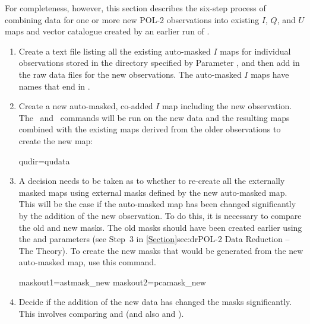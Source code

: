 For completeness, however, this section describes the six-step process of
combining data for one or more new POL-2 observations into existing $I$, $Q$,
and $U$ maps and vector catalogue created by an earlier run of .
\begin{enumerate}

\item Create a text file listing all the existing auto-masked $I$ maps
  for individual observations stored in the directory specified by
  Parameter , and then add in the raw data files for the new
  observations. The auto-masked $I$ maps have names that end in
  .

\begin{terminalv}
\end{terminalv}


\item Create a new auto-masked, co-added $I$ map including the new
  observation. The \calcqu\ and \makemap\ commands   will be run on the new
  data and the resulting maps combined with the existing maps derived
  from the older observations to create the new map:

\begin{terminalv}
     qudir=qudata
\end{terminalv}


\item A decision needs to be taken as to whether to re-create all the
  externally masked maps using external masks defined by the new
  auto-masked map. This will be the case if the auto-masked map has
  been changed significantly by the addition of the new
  observation. To do this, it is necessary to compare the old and new
  masks. The old masks should have been created earlier using the
   and  parameters (see Step~3 in
  \cref{Section}{sec:dr}{POL-2 Data Reduction -- The Theory}). To
  create the new masks that would be generated from the new
  auto-masked map, use this command.

\begin{terminalv}
     maskout1=astmask_new  maskout2=pcamask_new
\end{terminalv}

\item Decide if the addition of the new data has changed the masks
  significantly. This involves comparing  and
   (and also  and
  ).



\end{enumerate}
